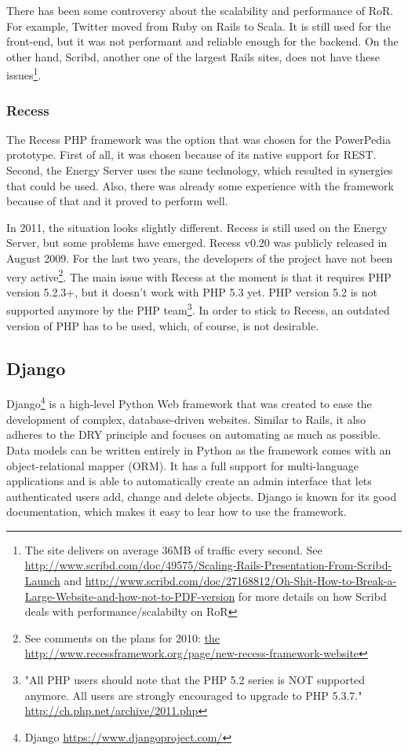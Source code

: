 There has been some controversy about the scalability and performance of RoR. For example, Twitter moved from Ruby on Rails to Scala. It is still used for the front-end, but it was not performant and reliable enough for the backend\cite{twitter_ruby_scala}. On the other hand, Scribd, another one of the largest Rails sites, does not have these issues\footnote{The site delivers on average 36MB of traffic every second. See \url{http://www.scribd.com/doc/49575/Scaling-Rails-Presentation-From-Scribd-Launch} and \url{http://www.scribd.com/doc/27168812/Oh-Shit-How-to-Break-a-Large-Website-and-how-not-to-PDF-version} for more details on how Scribd deals with performance/scalabilty on RoR}.

\subsubsection{Recess}
The Recess PHP framework was the option that was chosen for the PowerPedia prototype. First of all, it was chosen because of its native support for REST. Second, the Energy Server uses the same technology, which resulted in synergies that could be used. Also, there was already some experience with the framework because of that and it proved to perform well.

In 2011, the situation looks slightly different. Recess is still used on the Energy Server, but some problems have emerged. Recess v0.20 was publicly released in August 2009. For the last two years, the developers of the project have not been very active\footnote{See comments on the plans for 2010: \url{the http://www.recessframework.org/page/new-recess-framework-website}}. The main issue with Recess at the moment is that it requires PHP version 5.2.3+, but it doesn't work with PHP 5.3 yet. PHP version 5.2 is not supported anymore by the PHP team\footnote{"All PHP users should note that the PHP 5.2 series is NOT supported anymore. All users are strongly encouraged to upgrade to PHP 5.3.7." \url{http://ch.php.net/archive/2011.php}}. In order to stick to Recess, an outdated version of PHP has to be used, which, of course, is not desirable.  

\subsection{Django}
Django\footnote{Django \url{https://www.djangoproject.com/}} is a high-level Python Web framework that was created to ease the development of complex, database-driven websites. Similar to Rails, it also adheres to the DRY principle and focuses on automating as much as possible. Data models can be written entirely in Python as the framework comes with an object-relational mapper (ORM). It has a full support for multi-language applications and is able to automatically create an admin interface that lets authenticated users add, change and delete objects. Django is known for its good documentation, which makes it easy to lear how to use the framework.

